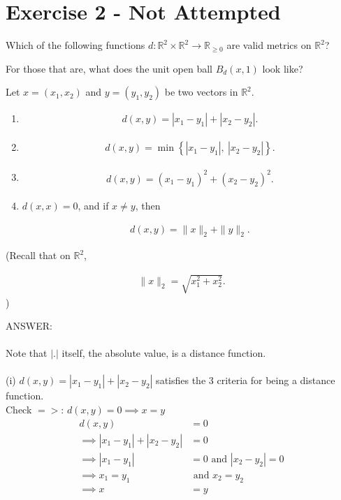 \documentclass[12pt]{article}
\begin{document}
\newpage

\section*{Exercise 2 - Not Attempted}

\noindent

Which of the following functions $d:\mathbb{R}^2\times\mathbb{R}^2\to\mathbb{R}_{\geq 0}$ are valid metrics on $\mathbb{R}^2$?

For those that are, what does the unit open ball $B_d(x,1)$ look like?

Let $x=(x_1,x_2)$ and $y=(y_1,y_2)$ be two vectors in $\mathbb{R}^2$.

\begin{enumerate}[label=\roman*)]

\item
\begin{align*}
d(x,y)=|x_1-y_1|+|x_2-y_2|.
\end{align*}

\item
\begin{align*}
d(x,y)=\min\left\{|x_1-y_1|,\ |x_2-y_2|\right\}.
\end{align*}

\item
\begin{align*}
d(x,y)=(x_1-y_1)^2+(x_2-y_2)^2.
\end{align*}

\item $d(x,x)=0$, and if $x\neq y$, then

\begin{align*}
d(x,y)=\|x\|_2+\|y\|_2.
\end{align*}

\end{enumerate}

\noindent
(Recall that on $\mathbb{R}^2$,

\begin{align*}
\|x\|_2=\sqrt{x_1^2+x_2^2}.
\end{align*}
)

\vspace{1cm}
\noindent
ANSWER:\\
\\
Note that $|.|$ itself, the absolute value, is a distance function.\\
\\
(i) $d(x,y) = |x_1 - y_1| + |x_2 - y_2|$ satisfies the 3 criteria for being a distance function.\\
Check $=>$: $d(x,y) = 0 \implies x=y$
\begin{align*}
  d(x,y) &= 0 \\
  \implies |x_1 - y_1| + |x_2 - y_2| &= 0 \\
  \implies |x_1 - y_1| &= 0 \text{ and } |x_2 - y_2| = 0 \\
  \implies x_1 = y_1 &\text{ and } x_2 = y_2 \\
  \implies x &= y
\end{align*}
\end{document}
